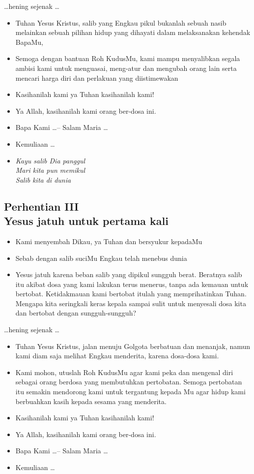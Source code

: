 \documentclass[a5paper,headsepline,titlepage,10pt,nnormalheadings,DIVcalc]{scrbook}
\newcommand{\BU}[1]{\begin{itemize} \item[U:] #1 \end{itemize}}
\newcommand{\BP}[1]{\begin{itemize} \item[P:] #1 \end{itemize}}
\newcommand{\BL}[1]{\begin{itemize} \item[L:] #1 \end{itemize}}
\begin{document}
\begin{center}\dots hening sejenak \dots\end{center}

\BP{Tuhan Yesus Kristus, salib yang Engkau pikul bukanlah sebuah nasib melainkan sebuah pilihan hidup yang dihayati dalam melaksanakan kehendak BapaMu,}
\BU{Semoga dengan bantuan Roh KudusMu, kami mampu menyalibkan segala ambisi kami untuk menguasai, meng-atur dan mengubah orang lain serta mencari harga diri dan perlakuan yang diistimewakan}
\BP{Kasihanilah kami ya Tuhan kasihanilah kami!}
\BU{Ya Allah, kasihanilah kami orang ber-dosa ini.}
\BP{Bapa Kami \dots -- Salam Maria \dots}
\BP{Kemuliaan \dots}

\begin{itemize}
\item[3.] \it{Kayu salib Dia panggul\\
Mari kita pun memikul\\
Salib kita di dunia}
\end{itemize}

\subsection*{Perhentian III
\\Yesus jatuh untuk pertama kali}

\BP{Kami menyembah Dikau, ya Tuhan dan bersyukur kepadaMu}
\BU{Sebab dengan salib suciMu Engkau telah menebus dunia}
\BL{Yesus jatuh karena beban salib yang dipikul sungguh berat. Beratnya salib itu akibat dosa yang kami lakukan terus menerus, tanpa ada kemauan untuk bertobat. Ketidakmauan kami bertobat itulah yang memprihatinkan Tuhan. Mengapa kita seringkali keras kepala sampai sulit untuk menyesali dosa kita dan bertobat dengan sungguh-sungguh?}

\begin{center}\dots hening sejenak \dots\end{center}

\BP{Tuhan Yesus Kristus, jalan menuju Golgota berbatuan dan menanjak, namun kami diam saja melihat Engkau menderita, karena dosa-dosa kami.}
\BU{Kami mohon, utuslah Roh KudusMu agar kami peka dan mengenal diri sebagai orang berdosa yang membutuhkan pertobatan. Semoga pertobatan itu semakin mendorong kami untuk tergantung kepada Mu agar hidup kami berbuahkan kasih kepada sesama yang menderita.}
\BP{Kasihanilah kami ya Tuhan kasihanilah kami!}
\BU{Ya Allah, kasihanilah kami orang ber-dosa ini.}
\BP{Bapa Kami \dots -- Salam Maria \dots}
\BP{Kemuliaan \dots}
\end{document}
